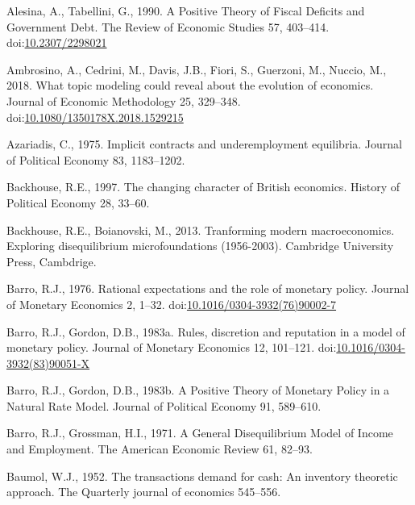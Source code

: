 \documentclass[
]{article}
\newlength{\cslhangindent}
\newlength{\cslentryspacingunit} %
\newenvironment{CSLReferences}[2] %
 {%
  \setlength{\parindent}{0pt}
  \ifodd #1
  \let\oldpar\par
  \def\par{\hangindent=\cslhangindent\oldpar}
  \fi
  \setlength{\parskip}{#2\cslentryspacingunit}
 }%
 {}
\begin{document}
\hypertarget{refs}{}
\begin{CSLReferences}{1}{0}
\leavevmode{}%
Alesina, A., Tabellini, G., 1990. A {Positive Theory} of {Fiscal
Deficits} and {Government Debt}. The Review of Economic Studies 57,
403--414. doi:\href{https://doi.org/10.2307/2298021}{10.2307/2298021}

\leavevmode{}%
Ambrosino, A., Cedrini, M., Davis, J.B., Fiori, S., Guerzoni, M.,
Nuccio, M., 2018. What topic modeling could reveal about the evolution
of economics. Journal of Economic Methodology 25, 329--348.
doi:\href{https://doi.org/10.1080/1350178X.2018.1529215}{10.1080/1350178X.2018.1529215}

\leavevmode{}%
Azariadis, C., 1975. Implicit contracts and underemployment equilibria.
Journal of Political Economy 83, 1183--1202.

\leavevmode{}%
Backhouse, R.E., 1997. The changing character of {British} economics.
History of Political Economy 28, 33--60.

\leavevmode{}%
Backhouse, R.E., Boianovski, M., 2013. Tranforming modern
macroeconomics. {Exploring} disequilibrium microfoundations (1956-2003).
{Cambridge University Press}, {Cambdrige}.

\leavevmode{}%
Barro, R.J., 1976. Rational expectations and the role of monetary
policy. Journal of Monetary Economics 2, 1--32.
doi:\href{https://doi.org/10.1016/0304-3932(76)90002-7}{10.1016/0304-3932(76)90002-7}

\leavevmode{}%
Barro, R.J., Gordon, D.B., 1983a. Rules, discretion and reputation in a
model of monetary policy. Journal of Monetary Economics 12, 101--121.
doi:\href{https://doi.org/10.1016/0304-3932(83)90051-X}{10.1016/0304-3932(83)90051-X}

\leavevmode{}%
Barro, R.J., Gordon, D.B., 1983b. A {Positive Theory} of {Monetary
Policy} in a {Natural Rate Model}. Journal of Political Economy 91,
589--610.

\leavevmode{}%
Barro, R.J., Grossman, H.I., 1971. A {General Disequilibrium Model} of
{Income} and {Employment}. The American Economic Review 61, 82--93.

\leavevmode{}%
Baumol, W.J., 1952. The transactions demand for cash: {An} inventory
theoretic approach. The Quarterly journal of economics 545--556.


\end{CSLReferences}
\end{document}
